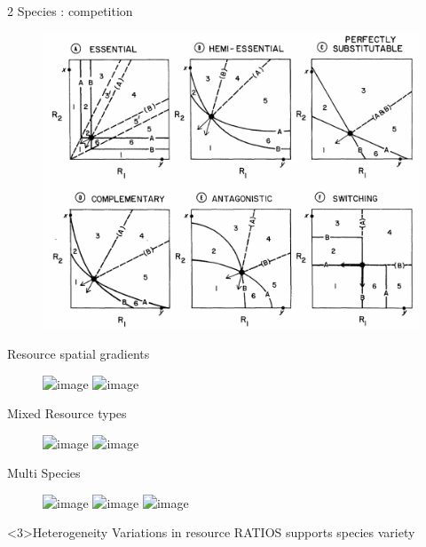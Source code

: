 \documentclass[final,xcolor=dvipsnames]{beamer}
\begin{document}
\begin{frame}{2 Species : competition}  
\begin{figure}
       \includegraphics[width=.8\framewidth]{Eq6types}
    \end{figure}
\end{frame}

\begin{frame}{Resource spatial gradients}
\begin{figure}
       \includegraphics<1>[width=.8\framewidth]{Eq6typesB}
       \includegraphics<2>[width=.8\framewidth]{RessourceGradients1}
    \end{figure}
\end{frame}

\begin{frame}{Mixed Resource types}
\begin{figure}
       \includegraphics<1>[width=.6\framewidth]{Mixed1}
       \includegraphics<2>[width=.6\framewidth]{RessourceGradients2}
    \end{figure}
\end{frame}


\begin{frame}{Multi Species}
\begin{figure}
       \includegraphics<1>[width=.6\framewidth]{5Species}
       \includegraphics<2>[width=.6\framewidth]{RessourceGradients3}
       \includegraphics<3>[width=.5\framewidth]{5Species}
    \end{figure}
    \begin{block}<3>{Heterogeneity}
    Variations in resource RATIOS supports species variety
    \end{block}
\end{frame}
\end{document}
